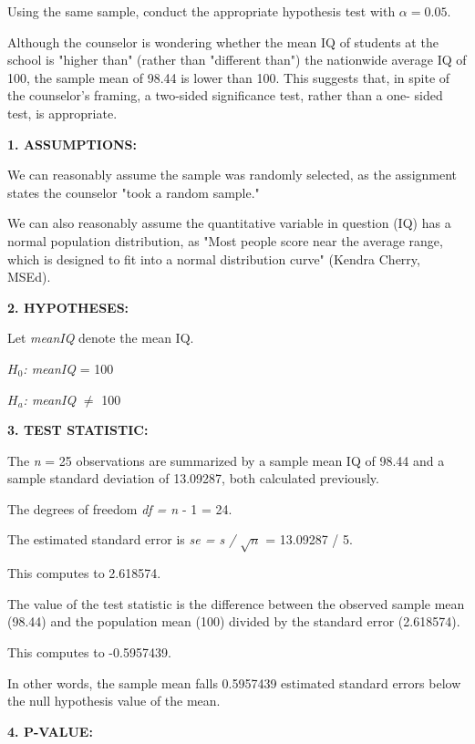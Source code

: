 \documentclass[12pt,letterpaper]{article}
\begin{document}
\begin{enumerate}
		\noindent Using the same sample, conduct the appropriate hypothesis test with $\alpha=0.05$.
		
		Although the counselor is wondering whether the mean IQ of students at the school is "higher than" (rather than "different than") the nationwide average IQ of 100, the sample mean of 98.44 is lower than 100. This suggests that, in spite of the counselor's framing, a two-sided significance test, rather than a one- sided test, is appropriate.
		
		\textbf{1. ASSUMPTIONS: }
		
		We can reasonably assume the sample was randomly selected, as the assignment states the counselor "took a random sample." 
		
		We can also reasonably assume the quantitative variable in question (IQ) has a normal population distribution, as "Most people score near the average range, which is designed to fit into a normal distribution curve" (Kendra Cherry, MSEd).
		
		\textbf{2. HYPOTHESES: }
		
		Let \textit{meanIQ} denote the mean IQ.
		
		\textit{$H_0$: meanIQ} = 100
		
		\textit{$H_a$: meanIQ} $\neq$ 100
		
		\textbf{3. TEST STATISTIC: }
		
		The \textit{n} = 25 observations are summarized by a sample mean IQ of 98.44 and a sample standard deviation of 13.09287, both calculated previously.
		
		The degrees of freedom \textit{df = n} - 1 = 24. 
		
		The estimated standard error is \textit{se = s / $\sqrt{n}$} = 13.09287 / 5.
		
		
		
		This computes to 2.618574.
		
		The value of the test statistic is the difference between the observed sample mean (98.44) and the population mean (100) divided by the standard error (2.618574).
		
		
		
		This computes to -0.5957439.
		
		In other words, the sample mean falls 0.5957439 estimated standard errors below the null hypothesis value of the mean. 
		
		\textbf{4. P-VALUE:}
		

\end{enumerate}
\end{document}
